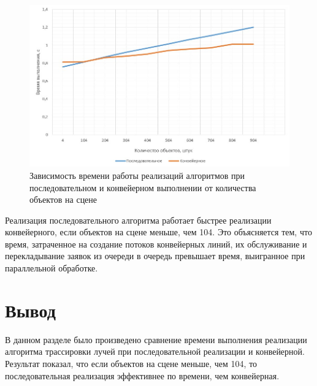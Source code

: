 \begin{figure}[H]
	\centering
	\includegraphics[width=0.9\linewidth]{inc/img/objects}
	\caption{Зависимость времени работы реализаций алгоритмов при последовательном и конвейерном выполнении от количества объектов на сцене}
	\label{fig:objects}
\end{figure}

Реализация последовательного алгоритма работает быстрее реализации конвейерного, если объектов на сцене меньше, чем 104. 
Это объясняется тем, что время, затраченное на создание потоков конвейерных линий, их обслуживание и перекладывание заявок из очереди в очередь превышает время, выигранное при параллельной обработке.

\section*{Вывод}

В данном разделе было произведено сравнение времени выполнения реализации алгоритма трассировки лучей при последовательной реализации и конвейерной.
Результат показал, что если объектов на сцене меньше, чем 104, то последовательная реализация эффективнее по времени, чем конвейерная.

